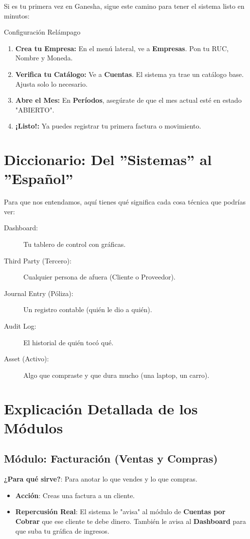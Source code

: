 \documentclass[12pt, a4paper, oneside]{book}
\begin{document}
Si es tu primera vez en Ganesha, sigue este camino para tener el sistema listo en minutos:

\begin{pasos}{Configuración Relámpago}
    \begin{enumerate}
        \item \textbf{Crea tu Empresa:} En el menú lateral, ve a \textbf{Empresas}. Pon tu RUC, Nombre y Moneda.
        \item \textbf{Verifica tu Catálogo:} Ve a \textbf{Cuentas}. El sistema ya trae un catálogo base. Ajusta solo lo necesario.
        \item \textbf{Abre el Mes:} En \textbf{Períodos}, asegúrate de que el mes actual esté en estado "ABIERTO".
        \item \textbf{¡Listo!:} Ya puedes registrar tu primera factura o movimiento.
    \end{enumerate}
\end{pasos}

\chapter{Diccionario: Del ''Sistemas'' al ''Español''}

Para que nos entendamos, aquí tienes qué significa cada cosa técnica que podrías ver:
\begin{description}
    \item[Dashboard:] Tu tablero de control con gráficas.
    \item[Third Party (Tercero):] Cualquier persona de afuera (Cliente o Proveedor).
    \item[Journal Entry (Póliza):] Un registro contable (quién le dio a quién).
    \item[Audit Log:] El historial de quién tocó qué.
    \item[Asset (Activo):] Algo que compraste y que dura mucho (una laptop, un carro).
\end{description}

\chapter{Explicación Detallada de los Módulos}

\section{Módulo: Facturación (Ventas y Compras)}
\textbf{¿Para qué sirve?}: Para anotar lo que vendes y lo que compras.
\begin{itemize}
    \item \textbf{Acción}: Creas una factura a un cliente.
    \item \textbf{Repercusión Real}: El sistema le "avisa" al módulo de \textbf{Cuentas por Cobrar} que ese cliente te debe dinero. También le avisa al \textbf{Dashboard} para que suba tu gráfica de ingresos.
\end{itemize}
\end{document}
